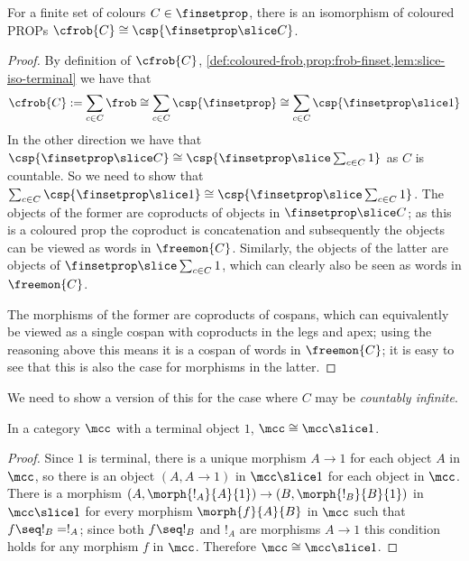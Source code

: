 \begin{theorem}
    \label{thm:frobc-iso-finset-slice-c}
    For a finite set of colours \(C \in \finsetprop\), there is an isomorphism
    of coloured PROPs \(\cfrob{C} \cong \csp{\finsetprop \slice C}\).
\end{theorem}
\begin{proof}
    By definition of \(\cfrob{C}\),
    \cref{def:coloured-frob,prop:frob-finset,lem:slice-iso-terminal}
    we have that \[
        \cfrob{C}
        :=
        \sum_{c \in C}\frob
        \cong
        \sum_{c \in C}\csp{\finsetprop}
        \cong
        \sum_{c \in C}\csp{\finsetprop \slice 1}
    \]
    In the other direction we have that \(
        \csp{\finsetprop \slice C}
        \cong
        \csp{\finsetprop \slice \sum_{c \in C} 1}
    \) as \(C\) is countable.
    So we need to show that \(
        \sum_{c \in C}\csp{\finsetprop \slice 1}
        \cong
        \csp{\finsetprop \slice \sum_{c \in C} 1}
    \).
    The objects of the former are coproducts of objects in
    \(\finsetprop \slice C\); as this is a coloured prop the coproduct is
    concatenation and subsequently the objects can be viewed as words in
    \(\freemon{C}\).
    Similarly, the objects of the latter are objects of
    \(\finsetprop \slice \sum_{c \in C} 1\), which can clearly also be
    seen as words in \(\freemon{C}\).

    The morphisms of the former are coproducts of cospans, which can
    equivalently be viewed as a single cospan with coproducts in the legs and
    apex; using the reasoning above this means it is a cospan of words in
    \(\freemon{C}\); it is easy to see that this is also the case for morphisms
    in the latter.
\end{proof}

We need to show a version of this for the case where \(C\) may be
\emph{countably infinite}.

\begin{lemma}
    \label{lem:slice-iso-terminal}
    In a category \(\mcc\) with a terminal object \(1\),
    \(\mcc \cong \mcc \slice 1\).
\end{lemma}
\begin{proof}
    Since \(1\) is terminal, there is a unique morphism \(A \to 1\) for each
    object \(A\) in \(\mcc\), so there is an object \((A, A \to 1)\) in
    \(\mcc \slice 1\) for each object in \(\mcc\).
    There is a morphism \((A, \morph{!_A}{A}{1}) \to (B, \morph{!_B}{B}{1})\) in
    \(\mcc \slice 1\) for every morphism \(\morph{f}{A}{B}\) in \(\mcc\) such
    that \(f \seq !_B = !_A\); since both \(f \seq !_B\) and \(!_A\) are
    morphisms \(A \to 1\) this condition holds for any morphism \(f\) in
    \(\mcc\).
    Therefore \(\mcc \cong \mcc \slice 1\).
\end{proof}

